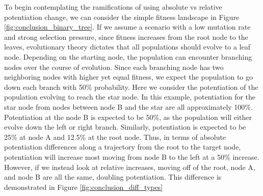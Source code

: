 To begin contemplating the ramifications of using absolute vs relative potentiation change, we can consider the simple fitness landscape in Figure \ref{fig:conclusion_binary_tree}.
If we assume a scenario with a low mutation rate and strong selection pressure, since fitness increases from the root node to the leaves, evolutionary theory dictates that all populations should evolve to a leaf node. 
Depending on the starting node, the population can encounter branching nodes over the course of evolution. 
Since each branching node has two neighboring nodes with higher yet equal fitness, we expect the population to go down each branch with 50\% probability. 
Here we consider the potentiation of the population evolving to reach the star node. 
In this example, potentiation for the star node from nodes between node B and the star are all approximately 100\%. 
Potentiation at the node B is expected to be 50\%, as the population will either evolve down the left or right branch. 
Similarly, potentiation is expected to be 25\% at node A and 12.5\% at the root node.
Thus, in terms of absolute potentiation differences along a trajectory from the root to the target node, potentiation will increase most moving from node B to the left at a 50\% increase. 
However, if we instead look at relative increases, moving off of the root, node A, and node B are all the same, doubling potentiation. 
This difference is demonstrated in Figure \ref{fig:conclusion_diff_types}

